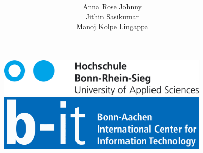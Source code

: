 \documentclass{article}
\title{\textbf{\myfont \color{cyan}{Assignment 02}}}
\author{Anna Rose Johnny\\ Jithin Sasikumar \\ Manoj Kolpe Lingappa}
\begin{document}
\begin{figure}[t]
	\begin{minipage}{0.6\textwidth}
		\includegraphics[width=0.9\textwidth]{logo.png}
	\end{minipage}\hfill
	\begin{minipage}{0.6\textwidth}
		\includegraphics[width=0.9\textwidth]{b-it.pdf}
	\end{minipage}
\end{figure}

\maketitle
\end{document}
